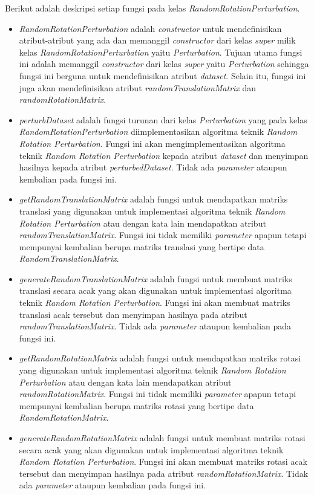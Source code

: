 Berikut adalah deskripsi setiap fungsi pada kelas \textit{RandomRotationPerturbation}.
\begin{itemize}
	\item \textit{RandomRotationPerturbation} adalah \textit{constructor} untuk mendefinisikan atribut-atribut yang ada dan memanggil \textit{constructor} dari kelas \textit{super} milik kelas \textit{RandomRotationPerturbation} yaitu \textit{Perturbation}. Tujuan utama fungsi ini adalah memanggil \textit{constructor} dari kelas \textit{super} yaitu \textit{Perturbation} sehingga fungsi ini berguna untuk mendefinisikan atribut \textit{dataset}. Selain itu, fungsi ini juga akan mendefinisikan atribut \textit{randomTranslationMatrix} dan \textit{randomRotationMatrix}.
	\item \textit{perturbDataset} adalah fungsi turunan dari kelas \textit{Perturbation} yang pada kelas \textit{RandomRotationPerturbation} diimplementasikan algoritma teknik \textit{Random Rotation Perturbation}. Fungsi ini akan mengimplementasikan algoritma teknik \textit{Random Rotation Perturbation} kepada atribut \textit{dataset} dan menyimpan hasilnya kepada atribut \textit{perturbedDataset}. Tidak ada \textit{parameter} ataupun kembalian pada fungsi ini.
	\item \textit{getRandomTranslationMatrix} adalah fungsi untuk mendapatkan matriks translasi yang digunakan untuk implementasi algoritma teknik \textit{Random Rotation Perturbation} atau dengan kata lain mendapatkan atribut \textit{randomTranslationMatrix}. Fungsi ini tidak memiliki \textit{parameter} apapun tetapi mempunyai kembalian berupa matriks translasi yang bertipe data \textit{RandomTranslationMatrix}.
	\item \textit{generateRandomTranslationMatrix} adalah fungsi untuk membuat matriks translasi secara acak yang akan digunakan untuk implementasi algoritma teknik \textit{Random Rotation Perturbation}. Fungsi ini akan membuat matriks translasi acak tersebut dan menyimpan hasilnya pada atribut \textit{randomTranslationMatrix}. Tidak ada \textit{parameter} ataupun kembalian pada fungsi ini.
	\item \textit{getRandomRotationMatrix} adalah fungsi untuk mendapatkan matriks rotasi yang digunakan untuk implementasi algoritma teknik \textit{Random Rotation Perturbation} atau dengan kata lain mendapatkan atribut \textit{randomRotationMatrix}. Fungsi ini tidak memiliki \textit{parameter} apapun tetapi mempunyai kembalian berupa matriks rotasi yang bertipe data \textit{RandomRotationMatrix}.
	\item \textit{generateRandomRotationMatrix} adalah fungsi untuk membuat matriks rotasi secara acak yang akan digunakan untuk implementasi algoritma teknik \textit{Random Rotation Perturbation}. Fungsi ini akan membuat matriks rotasi acak tersebut dan menyimpan hasilnya pada atribut \textit{randomRotationMatrix}. Tidak ada \textit{parameter} ataupun kembalian pada fungsi ini.
\end{itemize}

